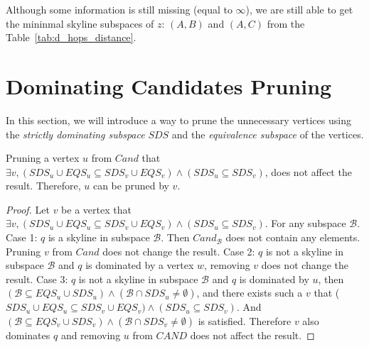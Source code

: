 Although some information is still missing (equal to $\infty$), we are still able to get the mininmal skyline subspaces of $z$: $(A, B)$ and $(A, C)$ from the Table~\ref{tab:d_hops_distance}.

\section{Dominating Candidates Pruning}

In this section, we will introduce a way to prune the unnecessary vertices using the \emph{strictly dominating subspace} $SDS$ and the \emph{equivalence subspace} of the vertices.

\begin{property}
\label{ppt:prune_cand}
Pruning a vertex $u$ from $Cand$ that $\exists v, (SDS_u \cup EQS_u \subseteq SDS_v \cup EQS_v) \wedge (SDS_u \subseteq SDS_v)$, does not affect the result. Therefore, $u$ can be pruned by $v$.
\end{property}

\begin{proof}
Let $v$ be a vertex that $\exists v, (SDS_u \cup EQS_u \subseteq SDS_v \cup EQS_v) \wedge (SDS_u \subseteq SDS_v)$. For any subspace $\mathcal{B}$. Case 1: $q$ is a skyline in subspace $\mathcal{B}$. Then $Cand_\mathcal{B}$ does not contain any elements. Pruning $v$ from $Cand$ does not change the result.
Case 2: $q$ is not a skyline in subspace $\mathcal{B}$ and $q$ is dominated by a vertex $w$, removing $v$ does not change the result. Case 3: $q$ is not a skyline in subspace $\mathcal{B}$ and $q$ is dominated by $u$, then $(\mathcal{B} \subseteq EQS_u \cup SDS_u) \wedge (\mathcal{B} \cap SDS_u \not= \emptyset)$, and there exists such a $v$ that ($SDS_u \cup EQS_u \subseteq SDS_v \cup EQS_v) \wedge (SDS_u \subseteq SDS_v)$. And $(\mathcal{B} \subseteq EQS_v \cup SDS_v) \wedge (\mathcal{B} \cap SDS_v \not= \emptyset)$ is satisfied. Therefore $v$ also dominates $q$ and removing $u$ from $CAND$ does not affect the result.
\end{proof}